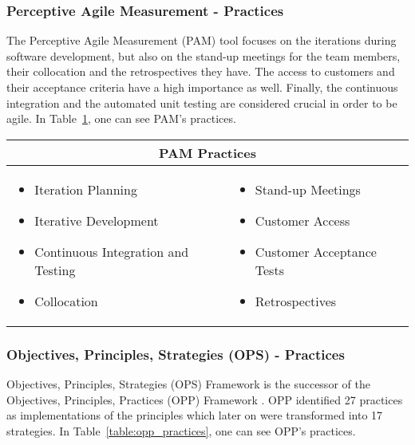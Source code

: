 \subsubsection[\ac{PAM} Practices]{Perceptive Agile Measurement - Practices}
The Perceptive Agile Measurement (\ac{PAM}) tool focuses on the iterations during software development, but also on the stand-up meetings for the team members, their collocation and the retrospectives they have. The access to customers and their acceptance criteria have a high importance as well. Finally, the continuous integration and the automated unit testing are considered crucial in order to be agile. In Table~\ref{table:pam_practices}, one can see \ac{PAM}'s practices.

\begin{table} [H]
  \begin{tabular}{| p{6cm} p{6cm} |}
    \hline
    \multicolumn{2}{|c|}{\textbf{\ac{PAM} Practices}}  \\ \hline
    	\begin{itemize} \item Iteration Planning \item Iterative Development \item Continuous Integration and Testing \item Collocation \end{itemize} &
     \begin{itemize} \item Stand-up Meetings \item Customer Access \item Customer Acceptance Tests \item Retrospectives \end{itemize}  \\ \hline
  \end{tabular}
  \label{table:pam_practices}
\end{table}

\subsubsection[\ac{OPS} Practices]{Objectives, Principles, Strategies (OPS) - Practices}
Objectives, Principles, Strategies (\ac{OPS}) Framework is the successor of the Objectives, Principles, Practices (\ac{OPP}) Framework \cite{opp}. \ac{OPP} identified 27 practices as implementations of the principles which later on were transformed into 17 strategies. In Table~\ref{table:opp_practices}, one can see \ac{OPP}'s practices. 

